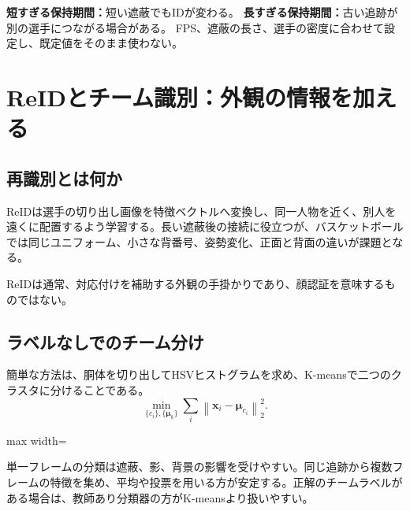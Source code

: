 \documentclass[11pt,a4paper,oneside]{report}
\begin{document}
\begin{riskBox}
\textbf{短すぎる保持期間：}短い遮蔽でもIDが変わる。\quad
\textbf{長すぎる保持期間：}古い追跡が別の選手につながる場合がある。\quad
FPS、遮蔽の長さ、選手の密度に合わせて設定し、既定値をそのまま使わない。
\end{riskBox}

\section{ReIDとチーム識別：外観の情報を加える}

\subsection{再識別とは何か}

ReIDは選手の切り出し画像を特徴ベクトルへ変換し、同一人物を近く、別人を遠くに配置するよう学習する。長い遮蔽後の接続に役立つが、バスケットボールでは同じユニフォーム、小さな背番号、姿勢変化、正面と背面の違いが課題となる。

ReIDは通常、対応付けを補助する外観の手掛かりであり、顔認証を意味するものではない。

\subsection{ラベルなしでのチーム分け}

簡単な方法は、胴体を切り出してHSVヒストグラムを求め、K-meansで二つのクラスタに分けることである。
\[
\min_{\{c_i\},\{\boldsymbol\mu_k\}}
\sum_i\left\|\mathbf x_i-\boldsymbol\mu_{c_i}\right\|_2^2.
\]

\begin{center}
\begin{adjustbox}{max width=\linewidth}
\end{adjustbox}
\end{center}

単一フレームの分類は遮蔽、影、背景の影響を受けやすい。同じ追跡から複数フレームの特徴を集め、平均や投票を用いる方が安定する。正解のチームラベルがある場合は、教師あり分類器の方がK-meansより扱いやすい。
\end{document}
